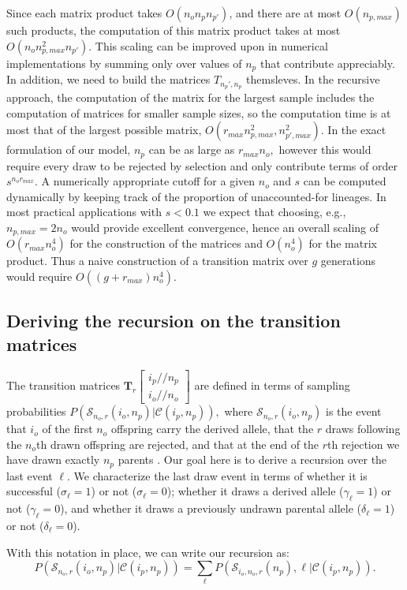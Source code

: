 \documentclass[review]{elsarticle}
\newcommand{\dslash}{/\!\!/}
\newcommand{\Coalc}[4]{\begin{bmatrix}#1\dslash #2 \\ #3\dslash #4 \end{bmatrix}}
\newcommand{\CC}{\mathcal{C}}
\newcommand{\ms}{\mathcal{S}}
\begin{document}
Since each matrix product takes $O(n_o n_p n_{p'})$, and there are at most $O(n_{p,max})$ such products, the computation of this
matrix product takes at most $O(n_o n_{p,max}^2 n_{p'}).$ This scaling can be improved upon in numerical 
implementations by summing only over values of $n_p$ that contribute appreciably. 
In addition, we need to build the matrices $T_{n_p', n_p}$ themsleves. 
In the recursive approach, the computation of the matrix for the largest sample includes the computation of matrices for
smaller sample sizes, so the computation time is at most that of the largest possible matrix, $O(r_{max} n_{p,max}^2, n_{p',max}^2).$ 
In the exact formulation of our model, $n_p$ can be as large as $ r_{max} n_o,$ however this would require every draw to be rejected by selection and
 only contribute terms of order $s^{n_o r_{max}}.$ A numerically appropriate cutoff for a given $n_o$ and $s$ can be computed dynamically 
 by keeping track of the proportion of unaccounted-for lineages. In most practical applications with $s<0.1$ we expect that choosing, e.g.,  
 $n_{p,max}=  2 n_o$ would provide excellent convergence, hence an overall scaling of   $O(r_{max} n_{o}^4)$ for the construction of 
 the matrices and $O(n_o^4)$ for the matrix product.
Thus a naive construction of a transition matrix over $g$ generations would require  $O( (g + r_{max} ) n_o^4).$ 

\subsection{Deriving the recursion on the transition matrices}
\label{subsec_apx_tpm_deriv}

The transition matrices $\mathbf{T}_{r}\Coalc{i_p}{n_p}{i_o}{n_o}$ are defined in terms of sampling
probabilities $P(\ms_{n_o,r}(i_o, n_p) | \CC{(i_p,n_p)} ),$ where $\ms_{n_o,r}(i_o,n_p)$ is the
event that $i_o$ of the first $n_o$ offspring carry the derived allele, that the $r$
draws following the $n_o$th drawn offspring are rejected, and that at the end of the $r$th
rejection we have drawn exactly $n_p$ parents . Our goal here is to derive a recursion
over the last event $\ell$. We characterize the last draw event in terms of whether it is
successful ($\sigma_\ell=1$) or not ($\sigma_\ell=0$); whether it draws a derived allele
($\gamma_\ell=1$) or not ($\gamma_\ell=0$), and whether it draws a previously undrawn parental
allele ($\delta_\ell=1$) or not ($\delta_\ell=0$).

With this notation in place, we can write our recursion as: 
 \begin{equation}
  P( \ms_{n_o,r}(i_o, n_p) | \CC{(i_p,n_p)} ) = \sum_\ell P( \ms_{i_o, n_o,r}(n_p),\ell | \CC(i_p,n_p) ) . 
 \end{equation}
\end{document}
